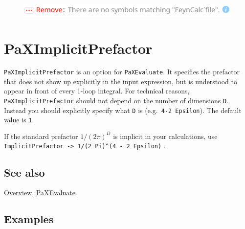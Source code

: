 \documentclass[../FeynHelpersManual.tex]{subfiles}
\begin{document}
\FloatBarrier
\begin{figure}[!ht]
\centering
\includegraphics[width=0.6\linewidth]{img/1ne6vpix78l6i.pdf}
\end{figure}
\FloatBarrier

\hypertarget{paximplicitprefactor}{
\section{PaXImplicitPrefactor}\label{paximplicitprefactor}}

\texttt{PaXImplicitPrefactor} is an option for \texttt{PaXEvaluate}. It
specifies the prefactor that does not show up explicitly in the input
expression, but is understood to appear in front of every 1-loop
integral. For technical reasons, \texttt{PaXImplicitPrefactor} should
not depend on the number of dimensions \texttt{D}. Instead you should
explicitly specify what \texttt{D} is (e.g.~\texttt{4-2 Epsilon}). The
default value is \texttt{1}.

If the standard prefactor \(1/(2 \pi)^D\) is implicit in your
calculations, use \texttt{ImplicitPrefactor -> 1/(2 Pi)^(4 - 2 Epsilon)}
.

\subsection{See also}

\hyperlink{toc}{Overview}, \hyperlink{paxevaluate}{PaXEvaluate}.

\subsection{Examples}
\end{document}
